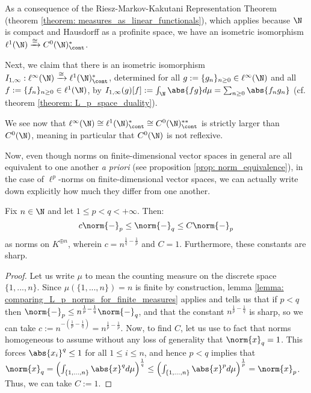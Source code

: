         \begin{example} \label{example: continuous_duals_of_convergent_sequence_spaces}
            As a consequence of the Riesz-Markov-Kakutani Representation Theorem (theorem \ref{theorem: measures_as_linear_functionals}), which applies because $\N$ is compact and Hausdorff as a profinite space, we have an isometric isomorphism $\ell^1(\N) \xrightarrow[]{\cong} C^0(\N)^*_{\cont}$.
            
            Next, we claim that there is an isometric isomorphism $I_{1, \infty}: \ell^{\infty}(\N) \xrightarrow[]{\cong} \ell^1(\N)^*_{\cont}$, determined for all $g := \{g_n\}_{n \geq 0} \in \ell^{\infty}(\N)$ and all $f := \{f_n\}_{n \geq 0} \in \ell^1(\N)$, by $I_{1, \infty}(g)[f] := \int_{\N} \abs{fg} d\mu = \sum_{n \geq 0} \abs{ f_n g_n }$ (cf. theorem \ref{theorem: L_p_space_duality}). 
                
            We see now that $\ell^{\infty}(\N) \cong \ell^1(\N)^*_{\cont} \cong C^0(\N)^{**}_{\cont}$ is strictly larger than $C^0(\N)$, meaning in particular that $C^0(\N)$ is not reflexive. 
        \end{example}

        Now, even though norms on finite-dimensional vector spaces in general are all equivalent to one another \textit{a priori} (see proposition \ref{prop: norm_equivalence}), in the case of $\ell^p$-norms on finite-dimensional vector spaces, we can actually write down explicitly how much they differ from one another.
        \begin{lemma} \label{lemma: sharp_comparison_of_ell_p_norms_in_finite_dimensions}
            Fix $n \in \N$ and let $1 \leq p < q < +\infty$. Then:
                $$c \norm{-}_p \leq \norm{-}_q \leq C \norm{-}_p$$
            as norms on $K^{\oplus n}$, wherein $c = n^{\frac1q - \frac1p}$ and $C = 1$. Furthermore, these constants are sharp.
        \end{lemma}
            \begin{proof}
                Let us write $\mu$ to mean the counting measure on the discrete space $\{1, ..., n\}$. Since $\mu(\{1, ..., n\}) = n$ is finite by construction, lemma \ref{lemma: comparing_L_p_norms_for_finite_measures} applies and tells us that if $p < q$ then $\norm{-}_p \leq n^{\frac1p - \frac1q} \norm{-}_q$, and that the constant $n^{\frac1p - \frac1q}$ is sharp, so we can take $c := n^{-(\frac1p - \frac1q)} = n^{\frac1p - \frac1p}$. Now, to find $C$, let us use to fact that norms homogeneous to assume without any loss of generality that $\norm{x}_q = 1$. This forces $\abs{x_i}^q \leq 1$ for all $1 \leq i \leq n$, and hence $p < q$ implies that $\norm{x}_q = \left( \int_{\{1, ..., n\}} \abs{x}^q d\mu \right)^{\frac1q} \leq \left( \int_{\{1, ..., n\}} \abs{x}^p d\mu \right)^{\frac1p} = \norm{x}_p$. Thus, we can take $C := 1$.
            \end{proof}

